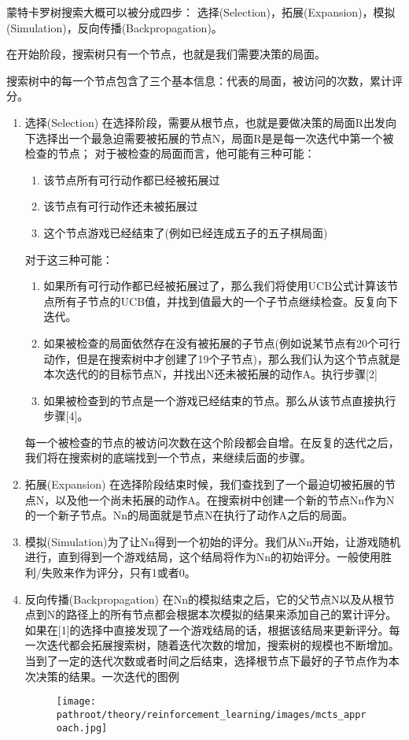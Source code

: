 \documentclass[10pt,a4paper]{ctexbook}
\providecommand{\pathroot}{../..}
\begin{document}
蒙特卡罗树搜索大概可以被分成四步：
选择(Selection)，拓展(Expansion)，模拟(Simulation)，反向传播(Backpropagation)。

在开始阶段，搜索树只有一个节点，也就是我们需要决策的局面。

搜索树中的每一个节点包含了三个基本信息：代表的局面，被访问的次数，累计评分。

\begin{enumerate}
\item 选择(Selection)
在选择阶段，需要从根节点，也就是要做决策的局面R出发向下选择出一个最急迫需要被拓展的节点N，局面R是是每一次迭代中第一个被检查的节点；
对于被检查的局面而言，他可能有三种可能：
    \begin{enumerate}
    \item 该节点所有可行动作都已经被拓展过
    \item 该节点有可行动作还未被拓展过
    \item 这个节点游戏已经结束了(例如已经连成五子的五子棋局面)
    \end{enumerate}

对于这三种可能：
    \begin{enumerate}
    \item 如果所有可行动作都已经被拓展过了，那么我们将使用UCB公式计算该节点所有子节点的UCB值，并找到值最大的一个子节点继续检查。反复向下迭代。
    \item 如果被检查的局面依然存在没有被拓展的子节点(例如说某节点有20个可行动作，但是在搜索树中才创建了19个子节点)，那么我们认为这个节点就是本次迭代的的目标节点N，并找出N还未被拓展的动作A。执行步骤[2]
    \item 如果被检查到的节点是一个游戏已经结束的节点。那么从该节点直接执行步骤[4]。
    \end{enumerate}
每一个被检查的节点的被访问次数在这个阶段都会自增。在反复的迭代之后，我们将在搜索树的底端找到一个节点，来继续后面的步骤。

\item 拓展(Expansion)
在选择阶段结束时候，我们查找到了一个最迫切被拓展的节点N，以及他一个尚未拓展的动作A。在搜索树中创建一个新的节点Nn作为N的一个新子节点。Nn的局面就是节点N在执行了动作A之后的局面。

\item 模拟(Simulation)为了让Nn得到一个初始的评分。我们从Nn开始，让游戏随机进行，直到得到一个游戏结局，这个结局将作为Nn的初始评分。一般使用胜利/失败来作为评分，只有1或者0。

\item 反向传播(Backpropagation)
在Nn的模拟结束之后，它的父节点N以及从根节点到N的路径上的所有节点都会根据本次模拟的结果来添加自己的累计评分。如果在[1]的选择中直接发现了一个游戏结局的话，根据该结局来更新评分。每一次迭代都会拓展搜索树，随着迭代次数的增加，搜索树的规模也不断增加。当到了一定的迭代次数或者时间之后结束，选择根节点下最好的子节点作为本次决策的结果。一次迭代的图例
\begin{figure}[ht]
    \centering
    \texttt{[image: \\pathroot/theory/reinforcement\_learning/images/mcts\_approach.jpg]}
    \label{fig:mcts_approach}
\end{figure}



\end{enumerate}
\end{document}
